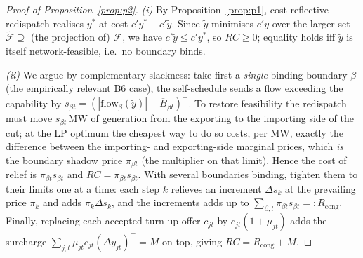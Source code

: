 \documentclass[review,3p,times]{elsarticle}
\theoremstyle{plain}
\theoremstyle{definition}
\begin{document}
\begin{proof}[Proof of Proposition~\ref{prop:p2}]
\emph{(i)} By Proposition~\ref{prop:p1}, cost-reflective redispatch realises
$y^\ast$ at cost $c'y^\ast-c'\tilde y$. Since $\tilde y$ minimises $c'y$ over the
larger set $\tilde{\mathcal F}\supseteq$ (the projection of) $\mathcal F$, we have
$c'\tilde y\le c'y^\ast$, so $RC\ge0$; equality holds iff $\tilde y$ is itself
network-feasible, i.e.\ no boundary binds.

\emph{(ii)} We argue by complementary slackness:
take first a \emph{single} binding boundary $\beta$ (the empirically relevant B6
case), the self-schedule sends a flow exceeding the capability by
$s_{\beta t}=(|\text{flow}_\beta(\tilde y)|-\overline B_{\beta t})^{+}$. To restore
feasibility the redispatch must move $s_{\beta t}$\,MW of generation from the
exporting to the importing side of the cut; at the LP optimum the cheapest way to
do so costs, per MW, exactly the difference between the importing- and
exporting-side marginal prices, which \emph{is} the boundary shadow price
$\pi_{\beta t}$ (the multiplier on that limit). Hence the cost of relief is
$\pi_{\beta t}s_{\beta t}$ and $RC=\pi_{\beta t}s_{\beta t}$. With several
boundaries binding, tighten them to their limits one at a time: each step $k$
relieves an increment $\Delta s_k$ at the prevailing price $\pi_k$ and adds
$\pi_k\Delta s_k$, and the increments adds up to
$\sum_{\beta,t}\pi_{\beta t}s_{\beta t}=:R_{\mathrm{cong}}$. Finally, replacing each accepted turn-up offer $c_{jt}$ by
$c_{jt}(1+\mu_{jt})$ adds the surcharge $\sum_{j,t}\mu_{jt}c_{jt}(\Delta
y_{jt})^{+}=M$ on top, giving $RC=R_{\mathrm{cong}}+M$.
\end{proof}
\end{document}
